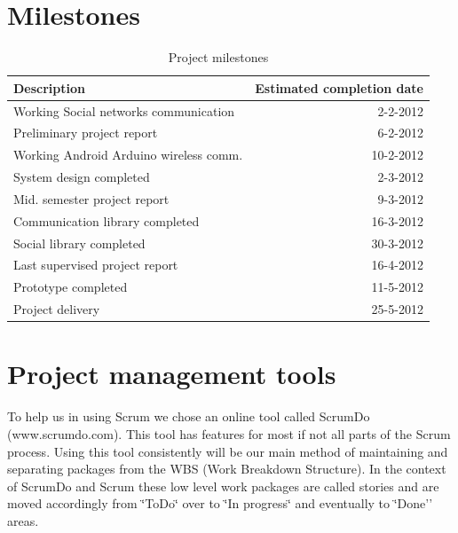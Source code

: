 \section{Milestones}
\begin{table}[h]
	\begin{tabular}{| l | r |}
		\hline

		\textbf{Description} & \textbf{Estimated completion date} \\
		\hline

		Working Social networks communication & 2-2-2012 \\
		\hline

		Preliminary project report & 6-2-2012 \\
		\hline

		Working Android Arduino wireless comm. & 10-2-2012 \\
		\hline

		System design completed & 2-3-2012 \\
		\hline

		Mid. semester project report & 9-3-2012 \\
		\hline

		Communication library completed & 16-3-2012 \\
		\hline

		Social library completed & 30-3-2012 \\
		\hline

		Last supervised project report & 16-4-2012 \\
		\hline

		Prototype completed & 11-5-2012 \\
		\hline

		Project delivery & 25-5-2012 \\
		\hline

	\end{tabular}
	\caption{Project milestones}
	\label{tbl:milestone}
\end{table}

\section{Project management tools}

To help us in using Scrum we chose an online tool called ScrumDo (www.scrumdo.com).
This tool has features for most if not all parts of the Scrum process. Using this tool
consistently will be our main method of maintaining and separating packages from
the WBS (Work Breakdown Structure). In the context of ScrumDo and
Scrum these low level work packages are called stories and are moved
accordingly from \char`\"{}ToDo\char`\"{} over to \char`\"{}In progress\char`\"{}
and eventually to \char`\"{}Done'' areas.
	
